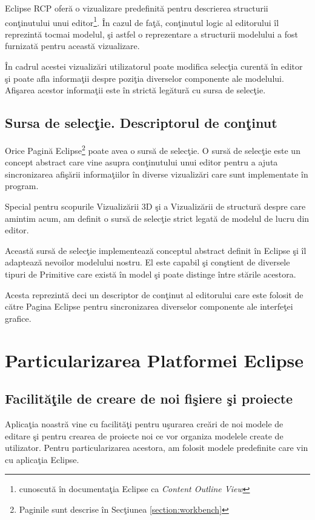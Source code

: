 Eclipse RCP oferă o vizualizare predefinită pentru descrierea structurii 
conţinutului unui editor\footnote{cunoscută în documentaţia Eclipse ca 
\textit{Content Outline View}}. În cazul de faţă, conţinutul logic al 
editorului îl reprezintă tocmai modelul, şi astfel o reprezentare a structurii 
modelului a fost furnizată pentru această vizualizare.

În cadrul acestei vizualizări utilizatorul poate modifica selecţia curentă în
editor şi poate afla informaţii despre poziţia diverselor componente ale
modelului. Afişarea acestor informaţii este în strictă legătură cu sursa de
selecţie.


\subsection{Sursa de selecţie. Descriptorul de conţinut}

Orice Pagină Eclipse\footnote{Paginile sunt descrise în Secţiunea
\ref{section:workbench}} poate avea o sursă de selecţie. O sursă de selecţie
este un concept abstract care vine asupra conţinutului unui editor pentru a
ajuta sincronizarea afişării informaţiilor în diverse vizualizări care sunt
implementate în program.

Special pentru scopurile Vizualizării 3D şi a Vizualizării de structură despre
care amintim acum, am definit o sursă de selecţie strict legată de modelul de
lucru din editor.

Această sursă de selecţie implementează conceptul abstract definit în Eclipse şi
îl adaptează nevoilor modelului nostru. El este capabil şi conştient de
diversele tipuri de Primitive care există în model şi poate distinge între
stările acestora.

Acesta reprezintă deci un descriptor de conţinut al editorului care este folosit
de către Pagina Eclipse pentru sincronizarea diverselor componente ale
interfeţei grafice.

\section{Particularizarea Platformei Eclipse}

\subsection{Facilităţile de creare de noi fişiere şi proiecte}

Aplicaţia noastră vine cu facilităţi pentru uşurarea creări de noi modele de
editare şi pentru crearea de proiecte noi ce vor organiza modelele create de
utilizator. Pentru particularizarea acestora, am folosit modele predefinite care
vin cu aplicaţia Eclipse.

